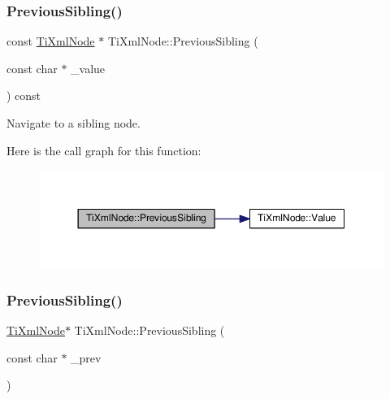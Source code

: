 \subsubsection{\texorpdfstring{Previous\+Sibling()}{PreviousSibling()}\hspace{0.1cm}{\footnotesize\ttfamily [3/4]}}
{\footnotesize\ttfamily const \hyperlink{class_ti_xml_node}{Ti\+Xml\+Node} $\ast$ Ti\+Xml\+Node\+::\+Previous\+Sibling (\begin{DoxyParamCaption}\item[{const char $\ast$}]{\+\_\+value }\end{DoxyParamCaption}) const}



Navigate to a sibling node. 

Here is the call graph for this function\+:
\nopagebreak
\begin{figure}[H]
\begin{center}
\leavevmode
\includegraphics[width=350pt]{class_ti_xml_node_ace1b618fe58b2b9305fe89bfbc8dd17b_cgraph}
\end{center}
\end{figure}
\mbox{\label{class_ti_xml_node_a6c977049207177ef21b51972315c2053}} 
\subsubsection{\texorpdfstring{Previous\+Sibling()}{PreviousSibling()}\hspace{0.1cm}{\footnotesize\ttfamily [4/4]}}
{\footnotesize\ttfamily \hyperlink{class_ti_xml_node}{Ti\+Xml\+Node}$\ast$ Ti\+Xml\+Node\+::\+Previous\+Sibling (\begin{DoxyParamCaption}\item[{const char $\ast$}]{\+\_\+prev }\end{DoxyParamCaption})\hspace{0.3cm}{\ttfamily [inline]}}

